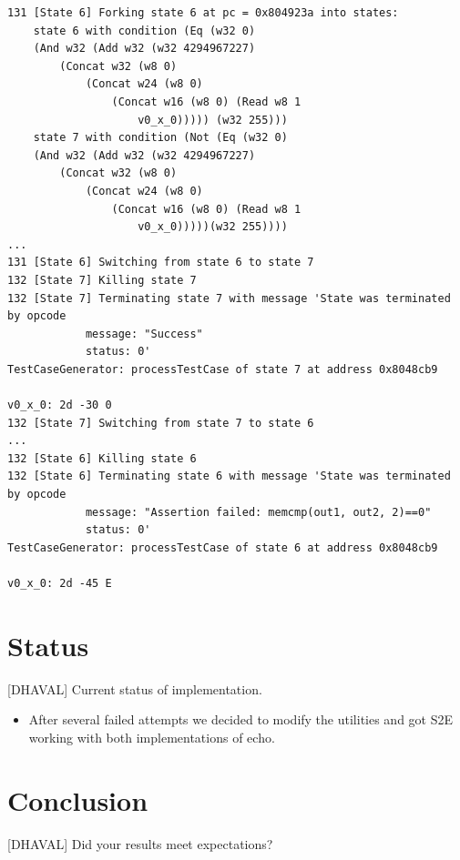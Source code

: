 \documentclass[conference]{IEEEtran}
\begin{document}
\begin{lstlisting}[style=C, label=s2e-equiv-result, abovecaptionskip=2ex, captionpos=b, caption={Partial output of equivalence testing for GNU Coreutils and Busybox}]
131 [State 6] Forking state 6 at pc = 0x804923a into states:
    state 6 with condition (Eq (w32 0)
    (And w32 (Add w32 (w32 4294967227)
        (Concat w32 (w8 0)
            (Concat w24 (w8 0)
                (Concat w16 (w8 0) (Read w8 1
                    v0_x_0))))) (w32 255)))
    state 7 with condition (Not (Eq (w32 0)
    (And w32 (Add w32 (w32 4294967227)
        (Concat w32 (w8 0)
            (Concat w24 (w8 0)
                (Concat w16 (w8 0) (Read w8 1 
                    v0_x_0)))))(w32 255))))
...
131 [State 6] Switching from state 6 to state 7
132 [State 7] Killing state 7
132 [State 7] Terminating state 7 with message 'State was terminated by opcode
            message: "Success"
            status: 0'
TestCaseGenerator: processTestCase of state 7 at address 0x8048cb9

v0_x_0: 2d -30 0
132 [State 7] Switching from state 7 to state 6
...
132 [State 6] Killing state 6
132 [State 6] Terminating state 6 with message 'State was terminated by opcode
            message: "Assertion failed: memcmp(out1, out2, 2)==0"
            status: 0'
TestCaseGenerator: processTestCase of state 6 at address 0x8048cb9

v0_x_0: 2d -45 E
\end{lstlisting}


\section{Status}

[DHAVAL] Current status of implementation.

\begin{itemize}
  \item After several failed attempts we decided to modify the utilities and got S2E working with both implementations of echo.
\end{itemize}


\section{Conclusion}

[DHAVAL] Did your results meet expectations?
\end{document}
